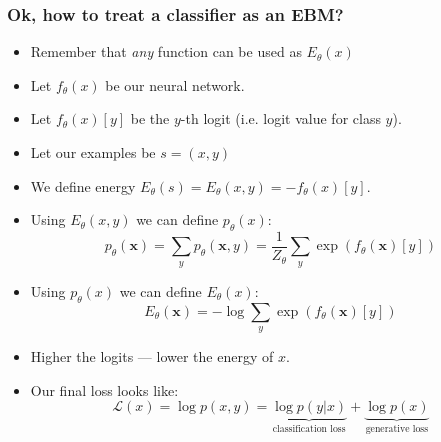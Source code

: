 \documentclass[10pt]{beamer}
\begin{document}
\begin{frame}
    \frametitle{Ok, how to treat a classifier as an EBM?}
    
    \begin{itemize}
        \item\pause Remember that \textit{any} function can be used as $E_\theta(x)$
        \item\pause Let $f_\theta(x)$ be our neural network.
        \item\pause Let $f_\theta(x)[y]$ be the $y$-th logit (i.e. logit value for class $y$).
        \item\pause Let our examples be $s = (x,y)$
        \item\pause We define energy $E_\theta(s) = E_\theta(x,y) = -f_\theta(x)[y]$.
        \item\pause Using $E_\theta(x,y)$ we can define $p_\theta(x)$:
        \begin{equation}
p_{\theta}(\mathbf{x})=\sum_{y} p_{\theta}(\mathbf{x}, y)=\frac{1}{Z_\theta}\sum_{y} \exp \left(f_{\theta}(\mathbf{x})[y]\right)
\end{equation}
        \item\pause Using $p_\theta(x)$ we can define $E_\theta(x)$:
        \begin{equation}
E_{\theta}(\mathbf{x})=-\log \sum_{y} \exp \left(f_{\theta}(\mathbf{x})[y]\right)
\end{equation}
        \item\pause Higher the logits --- lower the energy of $x$.
        \item\pause Our final loss looks like:
        \begin{equation}
            \mathcal{L}(x) = \log p(x,y) = \underbrace{\log p(y|x)}_\text{classification loss} + \underbrace{\log p(x)}_\text{generative loss}
        \end{equation}
    \end{itemize}
\end{frame}
\end{document}
